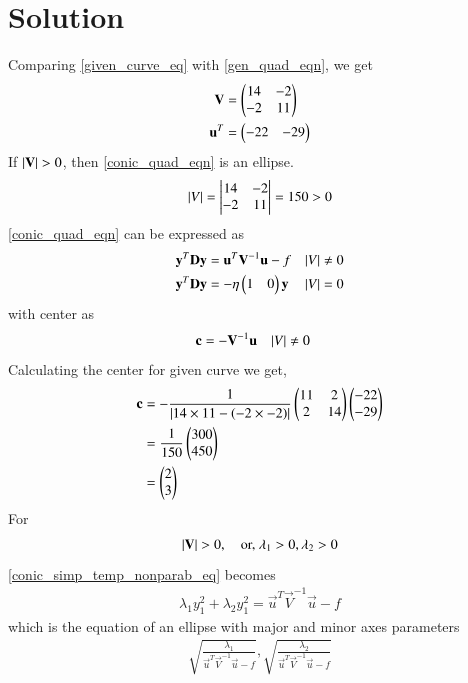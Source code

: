 \documentclass[journal,12pt,twocolumn]{IEEEtran}
\begin{document}
\section{Solution}

Comparing \eqref{given_curve_eq} with \eqref{gen_quad_eqn}, we get
\begin{align}
\mathbf{V} &= \begin{pmatrix}14  & -2 \\ -2 & 11\end{pmatrix}
\\
\mathbf{u}^T &= \begin{pmatrix}-22 & -29\end{pmatrix}
\end{align}
If $\left\vert\mathbf{V}\right\vert > 0$, then \eqref{conic_quad_eqn} is an ellipse. 
\begin{align}
\left\vert V\right\vert = \begin{vmatrix}14 & -2 \\ -2 & 11\end{vmatrix} = 150 > 0 \label{ellipse_proved_eq}
\end{align}
\eqref{conic_quad_eqn} can be expressed as
\begin{align}
\label{conic_simp_temp_nonparab_eq}
\mathbf{y}^T\mathbf{D}\mathbf{y} &=  \mathbf{u}^T\mathbf{V}^{-1}\mathbf{u} -f  &  \left\vert V\right\vert &\ne 0
\\
\mathbf{y}^T\mathbf{D}\mathbf{y} &=  -\eta\begin{pmatrix}1 & 0\end{pmatrix}\mathbf{y}   & \left\vert V\right\vert &= 0
\label{conic_simp_temp_parab_eq}
\end{align}
with center as 
\begin{align}
    \mathbf{c} &= - \mathbf{V}^{-1}\mathbf{u} & \left\vert V\right\vert &\ne 0
\end{align}
Calculating the center for given curve we get,
\begin{align}
    \mathbf{c} &= - \frac{1}{\left\vert14\times11 - \left(-2\times-2\right)\right\vert}\begin{pmatrix}11  & 2 \\ 2 & 14\end{pmatrix}\begin{pmatrix}-22 \\ -29\end{pmatrix} \\
    &= \frac{1}{150}\begin{pmatrix}300 \\ 450\end{pmatrix} \\
    &= \begin{pmatrix}2 \\ 3\end{pmatrix}
\end{align}
For 
\begin{align} 
\left\vert\mathbf{V}\right\vert > 0, \quad \text{or, } \lambda_1 > 0, \lambda_2 > 0 
\end{align} 
\eqref{conic_simp_temp_nonparab_eq} becomes 
\begin{align} \lambda_1y_1^2 +\lambda_2y_1^2 = 
\vec{u}^T\vec{V}^{-1}\vec{u} -f 
\end{align} 
which is the equation of an ellipse with major and minor axes 
parameters
\begin{align} 
\sqrt{\frac{\lambda_1}{\vec{u}^T\vec{V}^{-1}\vec{u} -f}}, 
\sqrt{\frac{\lambda_2}{\vec{u}^T\vec{V}^{-1}\vec{u} -f}} \label{axes_eq}
\end{align}
\end{document}
